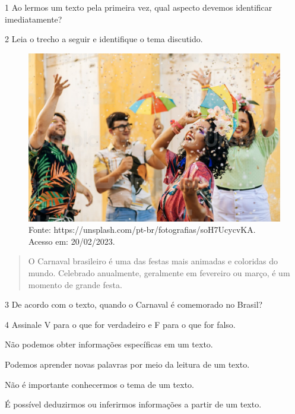 
\num{1}  Ao lermos um texto pela primeira vez, qual aspecto devemos identificar imediatamente?



\num{2} Leia o trecho a seguir e identifique o tema discutido.

\begin{figure}[htpb!]
\includegraphics[width=.5\textwidth]{./imgs/img2.jpg}
\caption{Fonte: https://unsplash.com/pt-br/fotografias/soH7UcycvKA. Acesso em: 20/02/2023.}
\end{figure}

\begin{quote}
O Carnaval brasileiro é uma das festas mais animadas e coloridas do
mundo. Celebrado anualmente, geralmente em fevereiro ou março, é um
momento de grande festa.
\end{quote}



\num{3} De acordo com o texto, quando o Carnaval é comemorado no Brasil?



\num{4} Assinale V para o que for verdadeiro e F para o que for falso.

\begin{boxlist}
 Não podemos obter informações específicas em um texto.

 Podemos aprender novas palavras por meio da leitura de um texto.

 Não é importante conhecermos o tema de um texto.

 É possível deduzirmos ou inferirmos informações a partir de um texto.
\end{boxlist}

